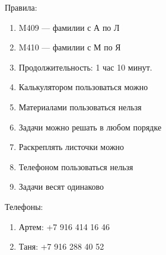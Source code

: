 \documentclass[A4, 12pt]{article}
\begin{document}
Правила:
\begin{enumerate}
\item M409 --- фамилии с А по Л
\item M410 --- фамилии с М по Я
\item Продолжительность: 1 час 10 минут.
\item Калькулятором пользоваться можно
\item Материалами пользоваться нельзя
\item Задачи можно решать в любом порядке
\item Раскреплять листочки можно
\item Телефоном пользоваться нельзя
\item Задачи весят одинаково
\end{enumerate}

Телефоны:
\begin{enumerate}
\item Артем: +7 916 414 16 46
\item Таня: +7 916 288 40 52
\end{enumerate}
\end{document}
